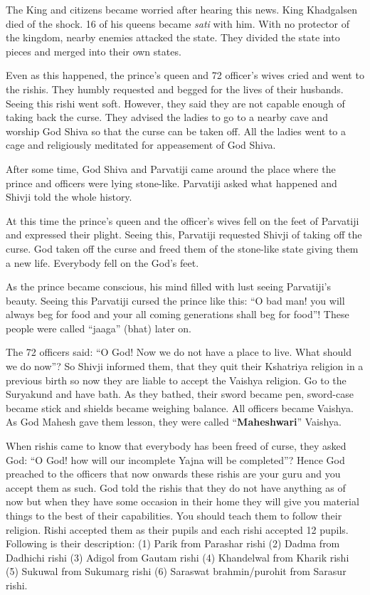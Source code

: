 The King and citizens became worried after hearing this news. King Khadgalsen died of the shock. 16 of his queens became \textit{sati} with him. With no protector of the kingdom, nearby enemies attacked the state. They divided the state into pieces and merged into their own states.

Even as this happened, the prince's queen and 72 officer's wives cried and went to the rishis. They humbly requested and begged for the lives of their husbands. Seeing this rishi went soft. However, they said they are not capable enough of taking back the curse. They advised the ladies to go to a nearby cave and worship God Shiva so that the curse can be taken off. All the ladies went to a cage and religiously meditated for appeasement of God Shiva.

After some time, God Shiva and Parvatiji came around the place where the prince and officers were lying stone-like. Parvatiji asked what happened and Shivji told the whole history.

At this time the prince's queen and the officer's wives fell on the feet of Parvatiji and expressed their plight. Seeing this, Parvatiji requested Shivji of taking off the curse. God taken off the curse and freed them of the stone-like state giving them a new life. Everybody fell on the God's feet.

As the prince became conscious, his mind filled with lust seeing Parvatiji's beauty. Seeing this Parvatiji cursed the prince like this: ``O bad man! you will always beg for food and your all coming generations shall beg for food''! These people were called ``jaaga'' (bhat) later on.

The 72 officers said: ``O God! Now we do not have a place to live. What should we do now''? So Shivji informed them, that they quit their Kshatriya religion in a previous birth so now they are liable to accept the Vaishya religion. Go to the Suryakund and have bath. As they bathed, their sword became pen, sword-case became stick and shields became weighing balance. All officers became Vaishya. As God Mahesh gave them lesson, they were called ``\textbf{Maheshwari}'' Vaishya.

When rishis came to know that everybody has been freed of curse, they asked God: ``O God! how will our incomplete Yajna will be completed''? Hence God preached to the officers that now onwards these rishis are your guru and you accept them as such. God told the rishis that they do not have anything as of now but when they have some occasion in their home they will give you material things to the best of their capabilities. You should teach them to follow their religion. Rishi accepted them as their pupils and each rishi accepted 12 pupils. Following is their description: 
(1) Parik from Parashar rishi (2) Dadma from Dadhichi rishi (3) Adigol from Gautam rishi (4) Khandelwal from Kharik rishi (5) Sukuwal from Sukumarg rishi (6) Saraswat brahmin/purohit from Sarasur rishi.

